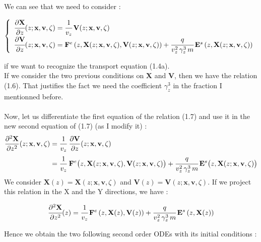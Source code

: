 \documentclass[10pt]{article}
\newcommand{\D}{{\partial}}
\begin{document}
We can see that we need to consider :

$$
\left\lbrace
    \begin{array}{ll}
\cfrac{\D \mathbf{X}}{\D z}(z;\mathbf{x},\mathbf{v},\zeta) = \cfrac{1}{v_z}\,\mathbf{V}(z;\mathbf{x},\mathbf{v},\zeta)     \\
\cfrac{\D \mathbf{V}}{\D z}(z;\mathbf{x},\mathbf{v},\zeta) = \mathbf{F}^e \left(z,\mathbf{X}(z;\mathbf{x},\mathbf{v},\zeta),\mathbf{V}(z;\mathbf{x},\mathbf{v},\zeta)\right) + \cfrac{q}{v_{z}^2\,\gamma_{z}^{3}\,m}\, \mathbf{E}^s\left(z,\mathbf{X}(z;\mathbf{x},\mathbf{v},\zeta)\right)
    \end{array}
\right.
$$

if we want to recognize the transport equation (1.4a). \\

If we consider the two previous conditions on $\mathbf{X}$ and $\mathbf{V}$, then we have the relation (1.6). That justifies the fact we need the coefficient $\gamma_{z}^3$ in the fraction I mentionned before. \\\\

Now, let us differentiate the first equation of the relation (1.7) and use it in the new second equation of (1.7) (as I modify it) :
\begin{align*}
\frac{\D^2 \mathbf{X}}{\D z^2}(z;\mathbf{x},\mathbf{v},\zeta) &= \frac{1}{v_{z}} \, \frac{\D \mathbf{V}}{\D z}(z;\mathbf{x},\mathbf{v},\zeta) \\
&= \frac{1}{v_{z}}\,\mathbf{F}^{e}\big(z,\mathbf{X}(z;\mathbf{x},\mathbf{v},\zeta),\mathbf{V}(z;\mathbf{x},\mathbf{v},\zeta)\big) + \cfrac{q}{v_{z}^2\,\gamma_{z}^{3}\,m}\, \mathbf{E}^{s}\big(z,\mathbf{X}(z;\mathbf{x},\mathbf{v},\zeta)\big)
\end{align*}
We consider $\mathbf{X}(z) = \mathbf{X}(z;\mathbf{x},\mathbf{v},\zeta)$ and $\mathbf{V}(z) = \mathbf{V}(z;\mathbf{x},\mathbf{v},\zeta)$. If we project this relation in the X and the Y directions, we have :

$$\cfrac{\D^2 \mathbf{X}}{\D z^2}(z) = \cfrac{1}{v_{z}}\,\mathbf{F}^e \left(z,\mathbf{X}(z),\mathbf{V}(z)\right) + \cfrac{q}{v_{z}^2\,\gamma_{z}^{3}\,m}\, \mathbf{E}^s\left(z,\mathbf{X}(z)\right)
$$

Hence we obtain the two following second order ODEs with its initial conditions :
\end{document}
